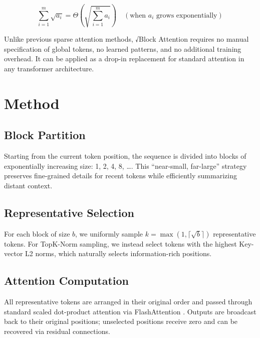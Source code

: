 \documentclass[11pt,a4paper]{article}
\begin{document}
\begin{equation}
\sum_{i=1}^{m} \sqrt{a_i} = \Theta\left(\sqrt{\sum_{i=1}^{m} a_i}\right) \quad (\text{when } a_i \text{ grows exponentially})
\label{eq:core}
\end{equation}

Unlike previous sparse attention methods, √Block Attention requires no manual specification of global tokens, no learned patterns, and no additional training overhead. It can be applied as a drop-in replacement for standard attention in any transformer architecture.

\section{Method}
\label{sec:method}

\subsection{Block Partition}

Starting from the current token position, the sequence is divided into blocks of exponentially increasing size: 1, 2, 4, 8, \ldots. This ``near-small, far-large'' strategy preserves fine-grained details for recent tokens while efficiently summarizing distant context.

\subsection{Representative Selection}

For each block of size $b$, we uniformly sample $k = \max(1, \lceil\sqrt{b}\rceil)$ representative tokens. For TopK-Norm sampling, we instead select tokens with the highest Key-vector L2 norms, which naturally selects information-rich positions.

\subsection{Attention Computation}

All representative tokens are arranged in their original order and passed through standard scaled dot-product attention via FlashAttention \cite{dao2022flashattention}. Outputs are broadcast back to their original positions; unselected positions receive zero and can be recovered via residual connections.
\end{document}
